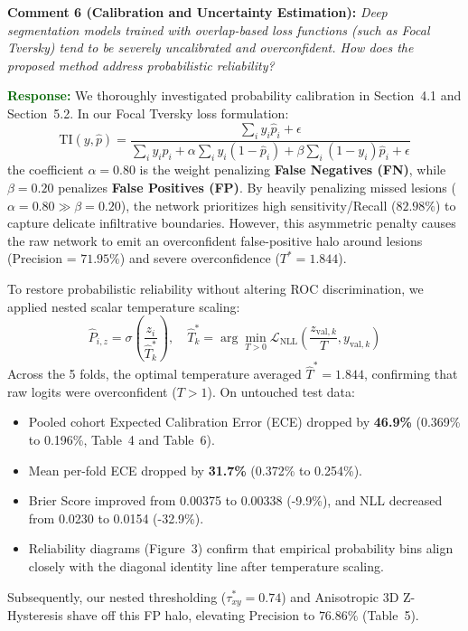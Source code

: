 \documentclass[11pt]{article}
\newcommand{\commentbox}[2]{%
\vspace{0.42em}\noindent
\textbf{\textcolor{NavyBlue}{#1:}} \textit{#2}\vspace{0.18em}%
}
\newcommand{\responsebox}[1]{%
\noindent
\textbf{\textcolor{DarkGreen}{Response:}} #1\vspace{0.42em}%
}
\begin{document}
\commentbox{Comment 6 (Calibration and Uncertainty Estimation)}{Deep segmentation models trained with overlap-based loss functions (such as Focal Tversky) tend to be severely uncalibrated and overconfident. How does the proposed method address probabilistic reliability?}
\responsebox{We thoroughly investigated probability calibration in Section~4.1 and Section~5.2. In our Focal Tversky loss formulation:
\begin{equation}
\text{TI}(y, \hat{p}) = \frac{\sum_i y_i \hat{p}_i + \epsilon}{\sum_i y_i \hat{p}_i + \alpha \sum_i y_i(1 - \hat{p}_i) + \beta \sum_i (1 - y_i)\hat{p}_i + \epsilon}
\end{equation}
the coefficient $\alpha = 0.80$ is the weight penalizing \textbf{False Negatives (FN)}, while $\beta = 0.20$ penalizes \textbf{False Positives (FP)}. By heavily penalizing missed lesions ($\alpha = 0.80 \gg \beta = 0.20$), the network prioritizes high sensitivity/Recall ($82.98\%$) to capture delicate infiltrative boundaries. However, this asymmetric penalty causes the raw network to emit an overconfident false-positive halo around lesions (Precision = $71.95\%$) and severe overconfidence ($T^* = 1.844$). 

To restore probabilistic reliability without altering ROC discrimination, we applied nested scalar temperature scaling:
\begin{equation}
\hat{P}_{i, z} = \sigma\left(\frac{z_{i}}{\hat{T}_k^*}\right), \quad \hat{T}_k^* = \arg\min_{T > 0} \mathcal{L}_{\text{NLL}}\left(\frac{z_{\text{val}, k}}{T}, y_{\text{val}, k}\right)
\end{equation}
Across the 5 folds, the optimal temperature averaged $\hat{T}^* = 1.844$, confirming that raw logits were overconfident ($T > 1$). On untouched test data:
\begin{itemize}
    \item Pooled cohort Expected Calibration Error (ECE) dropped by \textbf{46.9\%} (0.369\% to 0.196\%, Table~4 and Table~6).
    \item Mean per-fold ECE dropped by \textbf{31.7\%} (0.372\% to 0.254\%).
    \item Brier Score improved from 0.00375 to 0.00338 (-9.9\%), and NLL decreased from 0.0230 to 0.0154 (-32.9\%).
    \item Reliability diagrams (Figure~3) confirm that empirical probability bins align closely with the diagonal identity line after temperature scaling.
\end{itemize}
Subsequently, our nested thresholding ($\tau_{xy}^* = 0.74$) and Anisotropic 3D Z-Hysteresis shave off this FP halo, elevating Precision to $76.86\%$ (Table~5).}
\end{document}

